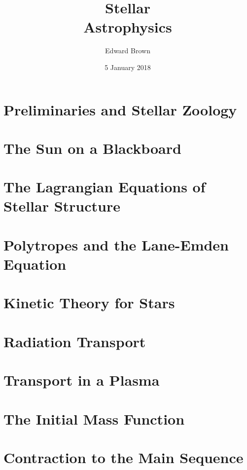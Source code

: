 \documentclass{astro-bookshelf}
\title{Stellar\\Astrophysics}
\author{Edward Brown}
\date{5 January 2018}
\begin{document}
\frontmatter
{}


\mainmatter
{}
\setcounter{page}{1}


\chapter[Preliminaries]{Preliminaries and Stellar Zoology}\label{ch.prelim}


\chapter{The Sun on a Blackboard}\label{ch.introduction}


\chapter[Equations of Stellar Structure]{The Lagrangian Equations of Stellar Structure}\label{ch.stellar-structure-eqn}


\chapter[Polytropes]{Polytropes and the Lane-Emden Equation}\label{ch.polytropes}


\chapter[Kinetic Theory]{Kinetic Theory for Stars}\label{ch.kinetic}
%

\chapter{Radiation Transport}


\chapter{Transport in a Plasma}\label{ch.plasma-transport}


\chapter{The Initial Mass Function}\label{ch.IMF}


\chapter{Contraction to the Main Sequence}

\end{document}
